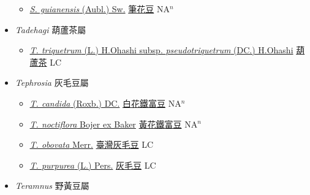 \begin{itemize}
  \begin{itemize}
        \item[] \href{http://www.theplantlist.org/tpl1.1/search?q=Stylosanthes+guianensis}{\textit{S. guianensis} (Aubl.) Sw.}   \href{\detokenize{http://taibnet.sinica.edu.tw/chi/taibnet_species_list.php?T2=筆花豆&T2_new_value=true&fr=y}}{筆花豆} NA$^n$
  \end{itemize}
 \item[] \textit{Tadehagi} 葫蘆茶屬
                    
  \begin{itemize}
        \item[] \href{http://www.theplantlist.org/tpl1.1/search?q=Tadehagi+triquetrum+subsp.+pseudotriquetrum}{\textit{T. triquetrum} (L.) H.Ohashi subsp. \textit{pseudotriquetrum} (DC.) H.Ohashi}   \href{\detokenize{http://taibnet.sinica.edu.tw/chi/taibnet_species_list.php?T2=葫蘆茶&T2_new_value=true&fr=y}}{葫蘆茶} LC
  \end{itemize}
 \item[] \textit{Tephrosia} 灰毛豆屬
                    
  \begin{itemize}
        \item[] \href{http://www.theplantlist.org/tpl1.1/search?q=Tephrosia+candida}{\textit{T. candida} (Roxb.) DC.}   \href{\detokenize{http://taibnet.sinica.edu.tw/chi/taibnet_species_list.php?T2=白花鐵富豆&T2_new_value=true&fr=y}}{白花鐵富豆} NA$^n$
        \item[] \href{http://www.theplantlist.org/tpl1.1/search?q=Tephrosia+noctiflora}{\textit{T. noctiflora} Bojer ex Baker}   \href{\detokenize{http://taibnet.sinica.edu.tw/chi/taibnet_species_list.php?T2=黃花鐵富豆&T2_new_value=true&fr=y}}{黃花鐵富豆} NA$^n$
        \item[] \href{http://www.theplantlist.org/tpl1.1/search?q=Tephrosia+obovata}{\textit{T. obovata} Merr.}   \href{\detokenize{http://taibnet.sinica.edu.tw/chi/taibnet_species_list.php?T2=臺灣灰毛豆&T2_new_value=true&fr=y}}{臺灣灰毛豆} LC
        \item[] \href{http://www.theplantlist.org/tpl1.1/search?q=Tephrosia+purpurea}{\textit{T. purpurea} (L.) Pers.}   \href{\detokenize{http://taibnet.sinica.edu.tw/chi/taibnet_species_list.php?T2=灰毛豆&T2_new_value=true&fr=y}}{灰毛豆} LC
  \end{itemize}
 \item[] \textit{Teramnus} 野黃豆屬
                    

\end{itemize}
